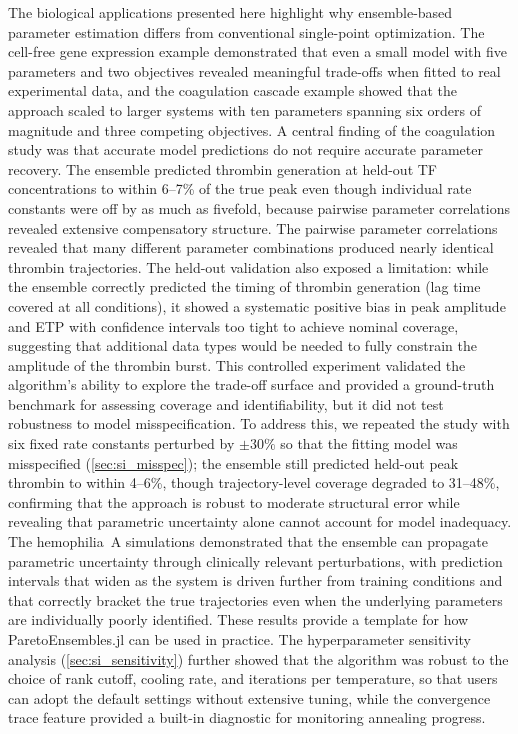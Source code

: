 \documentclass[12pt]{article}
\begin{document}
The biological applications presented here highlight why ensemble-based parameter estimation differs from conventional single-point optimization. The cell-free gene expression example demonstrated that even a small model with five parameters and two objectives revealed meaningful trade-offs when fitted to real experimental data, and the coagulation cascade example showed that the approach scaled to larger systems with ten parameters spanning six orders of magnitude and three competing objectives. A central finding of the coagulation study was that accurate model predictions do not require accurate parameter recovery. The ensemble predicted thrombin generation at held-out TF concentrations to within 6--7\% of the true peak even though individual rate constants were off by as much as fivefold, because pairwise parameter correlations revealed extensive compensatory structure. The pairwise parameter correlations revealed that many different parameter combinations produced nearly identical thrombin trajectories. The held-out validation also exposed a limitation: while the ensemble correctly predicted the timing of thrombin generation (lag time covered at all conditions), it showed a systematic positive bias in peak amplitude and ETP with confidence intervals too tight to achieve nominal coverage, suggesting that additional data types would be needed to fully constrain the amplitude of the thrombin burst. This controlled experiment validated the algorithm's ability to explore the trade-off surface and provided a ground-truth benchmark for assessing coverage and identifiability, but it did not test robustness to model misspecification. To address this, we repeated the study with six fixed rate constants perturbed by $\pm 30\%$ so that the fitting model was misspecified (\cref{sec:si_misspec}); the ensemble still predicted held-out peak thrombin to within 4--6\%, though trajectory-level coverage degraded to 31--48\%, confirming that the approach is robust to moderate structural error while revealing that parametric uncertainty alone cannot account for model inadequacy. The hemophilia~A simulations demonstrated that the ensemble can propagate parametric uncertainty through clinically relevant perturbations, with prediction intervals that widen as the system is driven further from training conditions and that correctly bracket the true trajectories even when the underlying parameters are individually poorly identified. These results provide a template for how ParetoEnsembles.jl can be used in practice. The hyperparameter sensitivity analysis (\cref{sec:si_sensitivity}) further showed that the algorithm was robust to the choice of rank cutoff, cooling rate, and iterations per temperature, so that users can adopt the default settings without extensive tuning, while the convergence trace feature provided a built-in diagnostic for monitoring annealing progress.
\end{document}
